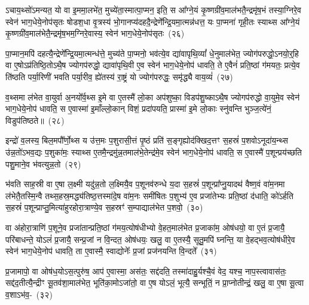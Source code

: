 ऽचाय॒थ्सो॑\-ऽमन्यत॒ यो वा इ॒ममा॒लभे॑त॒ मुच्ये॑ता॒स्मात्पा॒\-प्मन॒ इति॒ स आ᳚ग्ने॒यं कृ॒ष्णग्री॑व॒माल॑भतै॒न्द्रमृ॑ष॒भं तस्या॒ग्निरे॒व स्वेन॑ भाग॒धेये॒नोप॑सृतः षोडश॒धा वृ॒त्रस्य॑ भो॒गानप्य॑दह\-दै॒न्द्रेणे᳚न्द्रि॒य\-मा॒त्मन्न॑धत्त॒ यः पा॒प्मना॑ गृही॒तः स्याथ्स आ᳚ग्ने॒यं कृ॒ष्णग्री॑व॒माल॑भेतै॒न्द्रमृ॑ष॒भम॒ग्निरे॒वास्य॒ स्वेन॑ भाग॒धेये॒नोप॑सृतः~(२६)

पा॒प्मान॒मपि॑ दहत्यै॒न्द्रेणे᳚न्द्रि॒यमा॒त्मन्ध॑त्ते॒ मुच्य॑ते पा॒प्मनो॒ भव॑त्ये॒व द्या॑वापृथि॒व्यां᳚ धे॒नुमा\-ल॑भेत॒ ज्योग॑परुद्धो॒\-ऽनयो॒र्॒\mbox{}हि वा ए॒षो\-ऽप्र॑तिष्ठि॒तो\-ऽथै॒ष ज्योगप॑रुद्धो॒ द्यावा॑\-पृथि॒वी ए॒व स्वेन॑ भाग॒धेये॒नोप॑ धावति॒ ते ए॒वैनं॑ प्रति॒ष्ठां ग॑मयतः॒ प्रत्ये॒व ति॑ष्ठति पर्या॒रिणी॑ भवति पर्या॒रीव॒ ह्ये॑तस्य॑ रा॒ष्ट्रं यो ज्योग॑परुद्धः॒ समृ॑द्ध्यै वाय॒व्यं॑~(२७)

व॒थ्समा ल॑भेत वा॒युर्वा अ॒नयो᳚र्व॒थ्स इ॒मे वा ए॒तस्मै॑ लो॒का अप॑शुष्का॒ विडप॑शु॒ष्का\-ऽथै॒ष ज्योगप॑रुद्धो वा॒युमे॒व स्वेन॑ भाग॒धेये॒नोप॑ धावति॒ स ए॒वास्मा॑ इ॒माँल्लो॒कान् विशं॒ प्रदा॑पयति॒ प्रास्मा॑ इ॒मे लो॒काः स्नु॑वन्ति भुञ्ज॒त्ये॑नं॒ विडुप॑तिष्ठते॥~(२८)

{\anuvakamend[{म॒ध्यन्दि॑ने॒ कद्रुं॑ य॒मस्य॒ स्पर्ध॑मानो वैष्णावरु॒णीन्तमिन्द्रो᳚\-ऽस्य॒ स्वेन॑ भाग॒धेये॒नोप॑सृतो वाय॒व्यं॑ द्विच॑त्वारिꣳशच्च।}]}

इन्द्रो॑ व॒लस्य॒ बिल॒मपौ᳚र्णो॒थ्स य उ॑त्त॒मः प॒शुरासी॒त्तं पृ॒ष्ठं प्रति॑ स॒ङ्गृह्योद॑क्खिद॒त्तꣳ स॒हस्रं॑ प॒शवो\-ऽनूदा॑य॒न्थ्स उ॑न्न॒तो॑\-ऽभव॒द्यः प॒शुका॑मः॒ स्याथ्स ए॒तमै॒न्द्रमु॑न्न॒तमाल॑भे॒तेन्द्र॑मे॒व स्वेन॑ भाग॒धेये॒नोप॑ धावति॒ स ए॒वास्मै॑ प॒शून्प्रय॑च्छति पशु॒माने॒व भ॑वत्युन्न॒तो~(२९)

भ॑वति साह॒स्री वा ए॒षा ल॒क्ष्मी यदु॑न्न॒तो ल॒क्ष्मियै॒व प॒शूनव॑\-रुन्धे य॒दा स॒हस्रं॑ प॒शून्प्रा᳚प्नु॒यादथ॑ वैष्ण॒वं वा॑म॒नमा ल॑भेतै॒तस्मि॒न्वै तथ्स॒हस्र॒मद्ध्य॑तिष्ठ॒त्तस्मा॑दे॒ष वा॑म॒नः समी॑षितः प॒शुभ्य॑ ए॒व प्रजा॑तेभ्यः प्रति॒ष्ठां द॑धाति॒ को॑\-ऽर्\mbox{}हति स॒हस्रं॑ प॒शून्प्राप्तु॒मित्या॑हुरहोरा॒त्राण्ये॒व स॒हस्रꣳ॑ स॒म्पाद्याल॑भेत प॒शवो॒~(३०)

वा अ॑होरा॒त्राणि॑ प॒शूने॒व प्रजा॑तान्प्रति॒ष्ठां ग॑मय॒त्योष॑धीभ्यो वे॒हत॒माल॑भेत प्र॒जाका॑म॒ ओष॑धयो॒ वा ए॒तं प्र॒जायै॒ परि॑बाधन्ते॒ यो\-ऽलं॑ प्र॒जायै॒ सन्प्र॒जां न वि॒न्दत॒ ओष॑धयः॒ खलु॒ वा ए॒तस्यै॒ सूतु॒मपि॑ घ्नन्ति॒ या वे॒हद्भव॒त्योष॑धीरे॒व स्वेन॑ भाग॒धेये॒नोप॑ धावति॒ ता ए॒वास्मै॒ स्वाद्योनेः᳚ प्र॒जां प्रज॑नयन्ति वि॒न्दते᳚~(३१)

प्र॒जामापो॒ वा ओष॑ध॒यो\-ऽस॒त्पुरु॑ष॒ आप॑ ए॒वास्मा॒ अस॑तः॒ सद्द॑दति॒ तस्मा॑दाहु॒र्यश्चै॒वं वेद॒ यश्च॒ नाप॒स्त्वावास॑तः॒ सद्द॑द॒तीत्यै॒न्द्रीꣳ सू॒तव॑शा॒मा\-ल॑भेत॒ भूति॑का॒मो\-ऽजा॑तो॒ वा ए॒ष यो\-ऽलं॒ भूत्यै॒ सन्भूतिं॒ न प्रा॒प्नोतीन्द्रं॒ खलु॒ वा ए॒षा सू॒त्वा व॒शा\-ऽभ॑व॒-~(३२)

